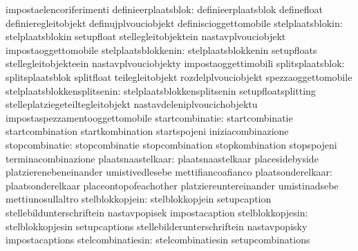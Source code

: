                                   impostaelencoriferimenti
             definieerplaatsblok: definieerplaatsblok              definefloat
                                  definieregleitobjekt             definujplvouciobjekt
                                  definiscioggettomobile
                stelplaatsblokin: stelplaatsblokin                 setupfloat
                                  stellegleitobjektein             nastavplvouciobjekt
                                  impostaoggettomobile
             stelplaatsblokkenin: stelplaatsblokkenin              setupfloats
                                  stellegleitobjekteein            nastavplvouciobjekty
                                  impostaoggettimobili
                splitsplaatsblok: splitsplaatsblok                 splitfloat
                                  teilegleitobjekt                 rozdelplvouciobjekt
                                  spezzaoggettomobile
     stelplaatsblokkensplitsenin: stelplaatsblokkensplitsenin      setupfloatsplitting
                                  stelleplatziegeteiltegleitobjekt nastavdeleniplvoucichobjektu
                                  impostaspezzamentooggettomobile
                 startcombinatie: startcombinatie                  startcombination
                                  startkombination                 startspojeni
                                  iniziacombinazione
                  stopcombinatie: stopcombinatie                   stopcombination
                                  stopkombination                  stopspojeni
                                  terminacombinazione
               plaatsnaastelkaar: plaatsnaastelkaar                placesidebyside
                                  platzierenebeneinander           umistivedlesebe
                                  mettifiancoafianco
               plaatsonderelkaar: plaatsonderelkaar                placeontopofeachother
                                  platziereuntereinander           umistinadsebe
                                  mettiunosullaltro
                 stelblokkopjein: stelblokkopjein                  setupcaption
                                  stellebildunterschriftein        nastavpopisek
                                  impostacaption                   %
                stelblokkopjesin: stelblokkopjesin                 setupcaptions
                                  stellebilderunterschriftein      nastavpopisky
                                  impostacaptions                  %
               stelcombinatiesin: stelcombinatiesin                setupcombinations

